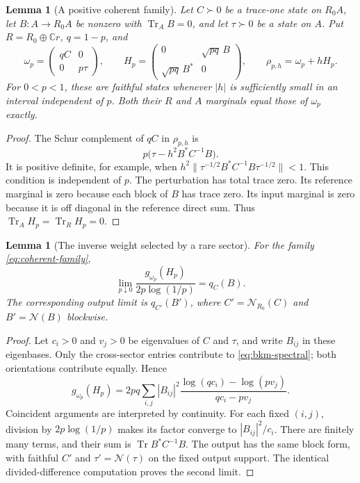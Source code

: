 \documentclass[11pt]{article}
\numberwithin{equation}{section}
\newtheorem{lemma}[theorem]{Lemma}
\theoremstyle{definition}
\theoremstyle{remark}
\DeclareMathOperator{\Tr}{Tr}
\newcommand{\N}{\mathcal N}
\newcommand{\norm}[1]{\lVert #1\rVert}
\begin{document}
\begin{lemma}[A positive coherent family]
\label{lem:coherent-family}
Let $C\succ0$ be a trace-one state on $R_0A$, let
$B:A\to R_0A$ be nonzero with $\Tr_A B=0$, and let $\tau\succ0$ be a
state on $A$. Put $R=R_0\oplus\mathbb C r$, $q=1-p$, and
\begin{equation}
 \omega_p=\begin{pmatrix}qC&0\\0&p\tau\end{pmatrix},\qquad
 H_p=\begin{pmatrix}0&\sqrt{pq}\,B\\
                    \sqrt{pq}\,B^*&0\end{pmatrix},
 \qquad \rho_{p,h}=\omega_p+hH_p .
 \label{eq:coherent-family}
\end{equation}
For $0<p<1$, these are faithful states whenever $|h|$ is sufficiently
small in an interval independent of $p$. Both their $R$ and $A$
marginals equal those of $\omega_p$ exactly.
\end{lemma}
\begin{proof}
The Schur complement of $qC$ in $\rho_{p,h}$ is
\[
 p\big(\tau-h^2B^*C^{-1}B\big).
\]
It is positive definite, for example, when
$h^2\norm{\tau^{-1/2}B^*C^{-1}B\tau^{-1/2}}<1$.
This condition is independent of $p$. The perturbation has total trace
zero. Its reference marginal is zero because each block of $B$ has trace
zero. Its input marginal is zero because it is off diagonal in the
reference direct sum. Thus $\Tr_AH_p=\Tr_RH_p=0$.
\end{proof}

\begin{lemma}[The inverse weight selected by a rare sector]
\label{lem:rare-bkm}
For the family \eqref{eq:coherent-family},
\begin{equation}
 \lim_{p\downarrow0}\frac{g_{\omega_p}(H_p)}
                              {2p\log(1/p)}=q_C(B).
 \label{eq:rare-bkm}
\end{equation}
The corresponding output limit is $q_{C'}(B')$, where
$C'=\N_{R_0}(C)$ and $B'=\N(B)$ blockwise.
\end{lemma}
\begin{proof}
Let $c_i>0$ and $v_j>0$ be eigenvalues of $C$ and $\tau$, and write
$B_{ij}$ in these eigenbases. Only the cross-sector entries contribute to
\eqref{eq:bkm-spectral}; both orientations contribute equally. Hence
\begin{equation}
 g_{\omega_p}(H_p)=
 2pq\sum_{i,j}|B_{ij}|^2
 \frac{\log(qc_i)-\log(pv_j)}{qc_i-pv_j}.
 \label{eq:coherent-bkm-exact}
\end{equation}
Coincident arguments are interpreted by continuity. For each fixed
$(i,j)$, division by $2p\log(1/p)$ makes its factor converge to
$|B_{ij}|^2/c_i$. There are finitely many terms, and their sum is
$\Tr B^*C^{-1}B$.
The output has the same block form, with faithful $C'$ and
$\tau'=\N(\tau)$ on the fixed output support. The identical
divided-difference computation proves the second limit.
\end{proof}
\end{document}
